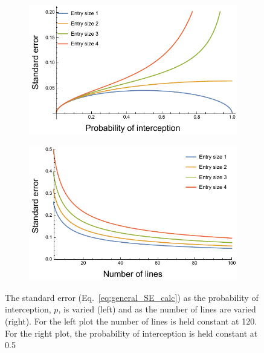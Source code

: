 \documentclass{article}
\begin{document}
\begin{figure}[h!]
\begin{subfigure}[b]{0.49\textwidth}
\includegraphics[width=\textwidth]{../asymptotic_approximation/SE_vs_pr_intercept.pdf}
\end{subfigure}
\hfill
\begin{subfigure}[b]{0.49\textwidth}
\includegraphics[width=\textwidth]{../asymptotic_approximation/SE_vs_num_lines.pdf}
\end{subfigure}

\caption{The standard error (Eq.~\eqref{eq:general_SE_calc}) as the probability of interception, \(p\), is varied (left) and as the number of lines are varied (right). For the left plot the number of lines is held constant at 120. For the right plot, the probability of interception is held constant at 0.5}
\label{fig:asymptotic_SE_plots}
\end{figure}
\end{document}
